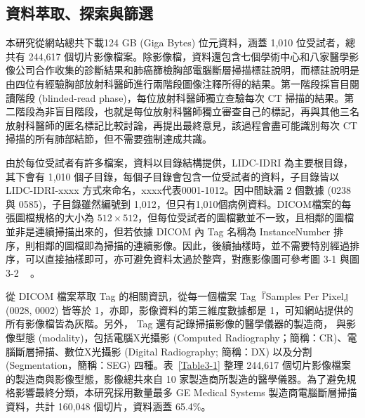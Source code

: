 \documentclass[12pt, a4paper]{article} 				%
\begin{document}
\subsection{資料萃取、探索與篩選}
本研究從網站總共下載124 GB (Giga Bytes) 位元資料，涵蓋 1,010 位受試者，總共有 244,617 個切片影像檔案。除影像檔，資料還包含七個學術中心和八家醫學影像公司合作收集的診斷結果和肺癌篩檢胸部電腦斷層掃描標註說明，而標註說明是由四位有經驗胸部放射科醫師進行兩階段圖像注釋所得的結果。第一階段採盲目閱讀階段 (blinded-read phase)，每位放射科醫師獨立查驗每次 CT 掃描的結果。第二階段為非盲目階段，也就是每位放射科醫師獨立審查自己的標記，再與其他三名放射科醫師的匿名標記比較討論，再提出最終意見，該過程會盡可能識別每次 CT 掃描的所有肺部結節，但不需要強制達成共識。

由於每位受試者有許多檔案，資料以目錄結構提供，LIDC-IDRI 為主要根目錄，其下會有 1,010 個子目錄，每個子目錄會包含一位受試者的資料，子目錄皆以 LIDC-IDRI-xxxx 方式來命名，xxxx代表0001-1012。因中間缺漏 2 個數據 (0238與 0585)，子目錄雖然編號到 1,012，但只有1,010個病例資料。DICOM檔案的每張圖檔規格的大小為 $512\times 512$，但每位受試者的圖檔數並不一致，且相鄰的圖檔並非是連續掃描出來的，但若依據 DICOM 內 Tag 名稱為 InstanceNumber 排序，則相鄰的圖檔即為掃描的連續影像。因此，後續抽樣時，並不需要特別經過排序，可以直接抽樣即可，亦可避免資料太過於整齊，對應影像圖可參考圖 3-1 與圖 3-2 ~\cite{Chen2018} 。

從 DICOM 檔案萃取 Tag 的相關資訊，從每一個檔案 Tag『Samples Per Pixel』(0028, 0002) 皆等於 1，亦即，影像資料的第三維度數據都是 1，可知網站提供的所有影像檔皆為灰階。另外， Tag 還有記錄掃描影像的醫學儀器的製造商， 與影像型態 (modality)，包括電腦X光攝影 (Computed Radiography；簡稱：CR)、電腦斷層掃描、數位X光攝影 (Digital Radiography; 簡稱：DX) 以及分割 (Segmentation，簡稱：SEG) 四種。表~\ref{Table3-1} 整理 244,617 個切片影像檔案的製造商與影像型態，影像總共來自 10 家製造商所製造的醫學儀器。為了避免規格影響最終分類，本研究採用數量最多 GE Medical Systems 製造商電腦斷層掃描資料，共計 160,048 個切片，資料涵蓋 65.4\%。
\end{document}
